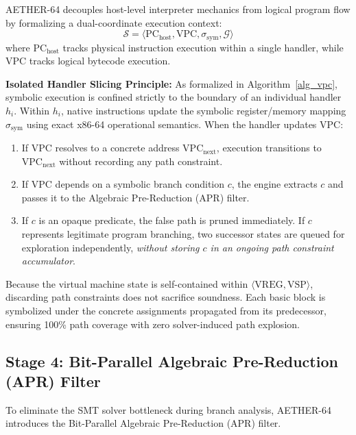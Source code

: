 \documentclass[11pt,a4paper]{article}
\begin{document}
AETHER-64 decouples host-level interpreter mechanics from logical program flow by formalizing a dual-coordinate execution context:
\begin{equation}
\mathcal{S} = \langle \text{PC}_{\text{host}}, \text{VPC}, \sigma_{\text{sym}}, \mathcal{G} \rangle
\end{equation}
where $\text{PC}_{\text{host}}$ tracks physical instruction execution within a single handler, while $\text{VPC}$ tracks logical bytecode execution.

\textbf{Isolated Handler Slicing Principle:} As formalized in Algorithm~\ref{alg_vpc}, symbolic execution is confined strictly to the boundary of an individual handler $h_i$. Within $h_i$, native instructions update the symbolic register/memory mapping $\sigma_{\text{sym}}$ using exact x86-64 operational semantics. When the handler updates $\text{VPC}$:
\begin{enumerate}
    \item If $\text{VPC}$ resolves to a concrete address $\text{VPC}_{\text{next}}$, execution transitions to $\text{VPC}_{\text{next}}$ without recording any path constraint.
    \item If $\text{VPC}$ depends on a symbolic branch condition $c$, the engine extracts $c$ and passes it to the Algebraic Pre-Reduction (APR) filter.
    \item If $c$ is an opaque predicate, the false path is pruned immediately. If $c$ represents legitimate program branching, two successor states are queued for exploration independently, \textit{without storing $c$ in an ongoing path constraint accumulator}.
\end{enumerate}

Because the virtual machine state is self-contained within $\langle \text{VREG}, \text{VSP} \rangle$, discarding path constraints does not sacrifice soundness. Each basic block is symbolized under the concrete assignments propagated from its predecessor, ensuring 100\% path coverage with zero solver-induced path explosion.

\subsection{Stage 4: Bit-Parallel Algebraic Pre-Reduction (APR) Filter}
To eliminate the SMT solver bottleneck during branch analysis, AETHER-64 introduces the Bit-Parallel Algebraic Pre-Reduction (APR) filter.
\end{document}
